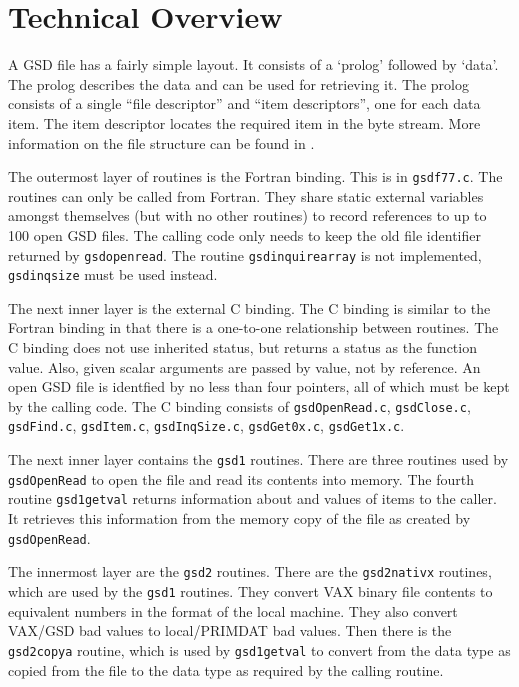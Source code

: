 \documentclass[twoside,11pt]{article}
\renewcommand{\_}{\texttt{\symbol{95}}}
\begin{document}
\appendix

\section{Technical Overview}

A GSD file has a fairly simple layout. It consists of a `prolog' followed by
`data'. The prolog describes the data and can be used for retrieving it.  The
prolog consists of a single ``file descriptor'' and ``item descriptors'', one
for each data item. The item descriptor locates the required item in the byte
stream. More information on the file structure can be found in \cite{F89}.

The outermost layer of routines is the Fortran binding. This is in
\texttt{gsd\_f77.c}. The routines can only be called from Fortran. They share
static external variables amongst themselves (but with no other routines) to
record references to up to 100 open GSD files. The calling code only needs to
keep the old file identifier returned by \texttt{gsd\_open\_read}. The routine
\texttt{gsd\_inquire\_array} is not implemented, \texttt{gsd\_inq\_size} must
be used instead.

The next inner layer is the external C binding. The C binding is similar to
the Fortran binding in that there is a one-to-one relationship between
routines. The C binding does not use inherited status, but returns a status as
the function value. Also, given scalar arguments are passed by value, not by
reference. An open GSD file is identfied by no less than four pointers, all of
which must be kept by the calling code.  The C binding consists of
\texttt{gsdOpenRead.c}, \texttt{gsdClose.c}, \texttt{gsdFind.c},
\texttt{gsdItem.c}, \texttt{gsdInqSize.c}, \texttt{gsdGet0x.c},
\texttt{gsdGet1x.c}.

The next inner layer contains the \texttt{gsd1\_} routines. There are three
routines used by \texttt{gsdOpenRead} to open the file and read its contents
into memory.  The fourth routine \texttt{gsd1\_getval} returns information
about and values of items to the caller. It retrieves this information from
the memory copy of the file as created by \texttt{gsdOpenRead}.

The innermost layer are the \texttt{gsd2\_} routines. There are the
\texttt{gsd2\_nativx} routines, which are used by the \texttt{gsd1\_}
routines. They convert VAX binary file contents to equivalent numbers in the
format of the local machine.  They also convert VAX/GSD bad values to
local/PRIMDAT bad values\cite{primdat}. Then there is the \texttt{gsd2\_copya}
routine, which is used by \texttt{gsd1\_getval} to convert from the data type
as copied from the file to the data type as required by the calling routine.
\end{document}
